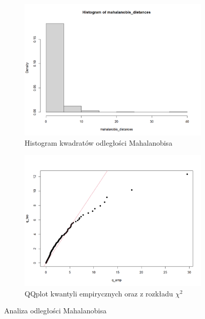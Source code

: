 \documentclass[a4paper,11pt]{article}
\begin{document}
\begin{figure}[!htb]
    \begin{subfigure}{0.45\textwidth}
        \centering
        \includegraphics[width=\linewidth]{images/mahalanobis_hist.png}
        \caption{Histogram kwadratów odległości Mahalanobisa}
        \label{fig:mahalanobis_hist}
    \end{subfigure}\hfill
    \begin{subfigure}{0.45\textwidth}
        \centering
        \includegraphics[width=\linewidth]{images/mahalanobis_qqplot.png}
        \caption{QQplot kwantyli empirycznych oraz z rozkładu $\chi^2$}
        \label{fig:mahalanobis_qqplot}
    \end{subfigure}   
    \caption{Analiza odległości Mahalanobisa}
\end{figure}
\end{document}
